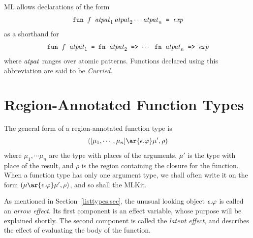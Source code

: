 \documentclass[12pt]{book}
\begin{document}
ML allows declarations of the form
%
$$\hbox{\tt fun $f$ ${\it atpat}_1\,{\it atpat}_2 \cdots {\it atpat}_n$ = $\hbox{\it exp}$}$$
as a shorthand for 
$$\hbox{\tt fun $f$ ${\it atpat}_1$ = fn ${\it atpat}_2$ => $\cdots$ fn ${\it atpat}_n$
  => $\hbox{\it exp}$}$$
where ${\it atpat}$ ranges over atomic patterns.  Functions
declared using this abbreviation are said to be
%
{\em Curried}.

\section{Region-Annotated Function Types}
\label{functiontypes.sec}
The general form of a region-annotated 
%
%
function type is
$$([\mu_1,\cdots,\mu_n] \ar{\epsilon.\rea} \mu', \rho)$$
where
$\mu_1,\cdots\mu_n$ are the type with places of the arguments, $\mu'$
is the type with place of the result, and $\rho$ is the region
containing the closure for the function. When a function type has only
one argument type, we shall often write it on the form $(\mu
\ar{\epsilon.\rea} \mu', \rho)$, and so shall the MLKit.

As mentioned in Section~\ref{listtypes.sec}, the unusual looking
object $\epsilon.\varphi$ is called an
%
{\em arrow effect}. Its first component
is an 
%
effect variable, whose purpose will be explained shortly.  The second
component is called the
%
{\em latent effect}, and describes the effect of evaluating the body
of the function.
\end{document}
